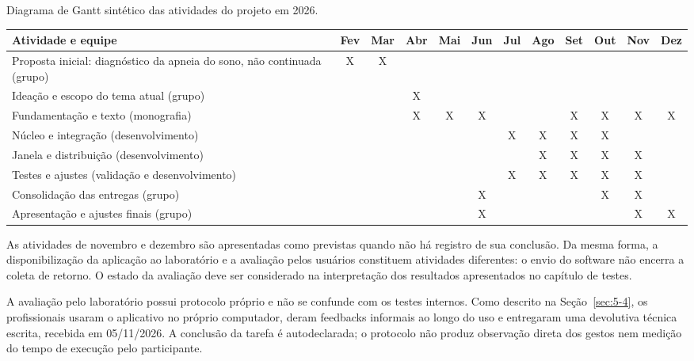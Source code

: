 \begin{quadro}[htbp]
\centering
\caption{Diagrama de Gantt sintético das atividades do projeto em 2026.}
\label{fig:4-gantt}
\begingroup
\scriptsize
\setlength{\tabcolsep}{2pt}
\begin{tabularx}{\textwidth}{|X|*{11}{c|}}
\hline
\textbf{Atividade e equipe} & Fev & Mar & Abr & Mai & Jun & Jul & Ago & Set & Out & Nov & Dez \\ \hline
Proposta inicial: diagnóstico da apneia do sono, não continuada (grupo) & X & X & & & & & & & & & \\ \hline
Ideação e escopo do tema atual (grupo) & & & X & & & & & & & & \\ \hline
Fundamentação e texto (monografia) & & & X & X & X & & & X & X & X & X \\ \hline
Núcleo e integração (desenvolvimento) & & & & & & X & X & X & X & & \\ \hline
Janela e distribuição (desenvolvimento) & & & & & & & X & X & X & X & \\ \hline
Testes e ajustes (validação e desenvolvimento) & & & & & & X & X & X & X & X & \\ \hline
Consolidação das entregas (grupo) & & & & & X & & & & X & X & \\ \hline
Apresentação e ajustes finais (grupo) & & & & & X & & & & & X & X \\ \hline
\end{tabularx}
\endgroup
\par{}
\end{quadro}

As atividades de novembro e dezembro são apresentadas como previstas quando não há registro de sua conclusão. Da mesma forma, a disponibilização da aplicação ao laboratório e a avaliação pelos usuários constituem atividades diferentes: o envio do software não encerra a coleta de retorno. O estado da avaliação deve ser considerado na interpretação dos resultados apresentados no capítulo de testes.

A avaliação pelo laboratório possui protocolo próprio e não se confunde com os testes internos. Como descrito na Seção~\ref{sec:5-4}, os profissionais usaram o aplicativo no próprio computador, deram feedbacks informais ao longo do uso e entregaram uma devolutiva técnica escrita, recebida em 05/11/2026. A conclusão da tarefa é autodeclarada; o protocolo não produz observação direta dos gestos nem medição do tempo de execução pelo participante.


